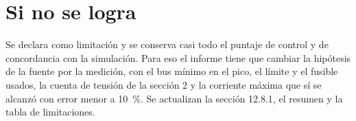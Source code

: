 \documentclass[11pt,a4paper]{article}
\begin{document}
\section{Si no se logra}

Se declara como limitación y se conserva casi todo el puntaje de control y de concordancia con la simulación. Para eso el informe tiene que cambiar la hipótesis de la fuente por la medición, con el bus mínimo en el pico, el límite y el fusible usados, la cuenta de tensión de la sección 2 y la corriente máxima que sí se alcanzó con error menor a \SI{10}{\percent}. Se actualizan la sección 12.8.1, el resumen y la tabla de limitaciones.
\end{document}
